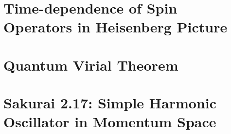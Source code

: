 \documentclass[
a4paper,
10pt,
twoside,
]{article}
\begin{document}
\titleinf
\maketitle
\startmcols

\section{Time-dependence of Spin Operators in Heisenberg Picture}
\subsection{} %
\subsection{} %
\subsection{} %

\section{Quantum Virial Theorem}
\subsection{} %
\subsection{} %
\subsection{} %

\section{Sakurai 2.17: Simple Harmonic Oscillator in Momentum Space}
\subsection{} %
\subsection{} %
\subsection{} %
\end{document}
